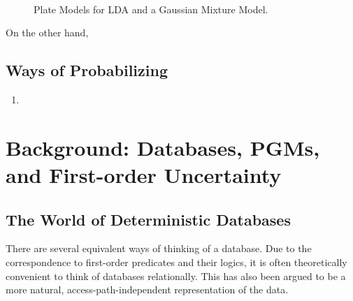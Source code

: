 \documentclass{article}
\theoremstyle{definition}
\theoremstyle{remark}
\begin{document}
\begin{figure}[H]
	\centering
	\hfill%
	\hfill%
	\hfill~\\
	\caption{Plate Models for LDA and a Gaussian Mixture Model.%
			\protect\footnotemark
		}\label{fig:platemodel-ex}

\end{figure}

On the other hand, 

\subsection{Ways of Probabilizing}
\begin{enumerate}
	\item 
\end{enumerate}

\section{Background: Databases, PGMs, and First-order Uncertainty}

\subsection{The World of Deterministic Databases}

There are several equivalent ways of thinking of a database. Due to the correspondence to first-order predicates and their logics, it is often theoretically convenient to think of databases relationally. This has also been argued \cite{Codd} to be a more natural, access-path-independent representation of the data.   
\end{document}
